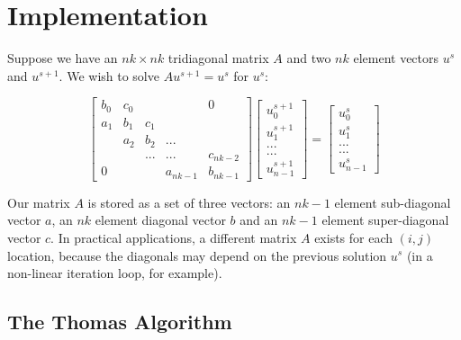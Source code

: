 \documentclass{sig-alternate-05-2015}
\begin{document}
\section{Implementation}
\label{sec:implementation}

Suppose we have an \(nk \times nk\) tridiagonal matrix \(A\) and two \(nk\) element
  vectors \(u^{s}\) and \(u^{s+1}\).  We wish to solve \(Au^{s+1} = u^{s}\) for
  \(u^{s}\):

\[
\begin{bmatrix}
b_0 & c_0 &     &          & 0        \\
a_1 & b_1 & c_1 &          &          \\
    & a_2 & b_2 & ...      &          \\
    &     & ... & ...      & c_{nk-2} \\
0   &     &     & a_{nk-1} & b_{nk-1}
\end{bmatrix}
\begin{bmatrix}
u^{s+1}_0     \\
u^{s+1}_1     \\
...     \\
...     \\
u^{s+1}_{n-1}
\end{bmatrix}
=
\begin{bmatrix}
u^{s}_0     \\
u^{s}_1     \\
...     \\
...     \\
u^{s}_{n-1}
\end{bmatrix}
\]

Our matrix \(A\) is stored as a set of three vectors: an \(nk-1\) element
  sub-diagonal vector \(a\), an \(nk\) element diagonal vector \(b\) and an
  \(nk-1\) element super-diagonal vector \(c\).
In practical applications, a different matrix \(A\) exists for each \((i,j)\)
  location, because the diagonals may depend on the previous solution \(u^{s}\)
  (in a non-linear iteration loop, for example).


\subsection{The Thomas Algorithm}
\label{sec:implementation:thomas_algorithm}
\end{document}

